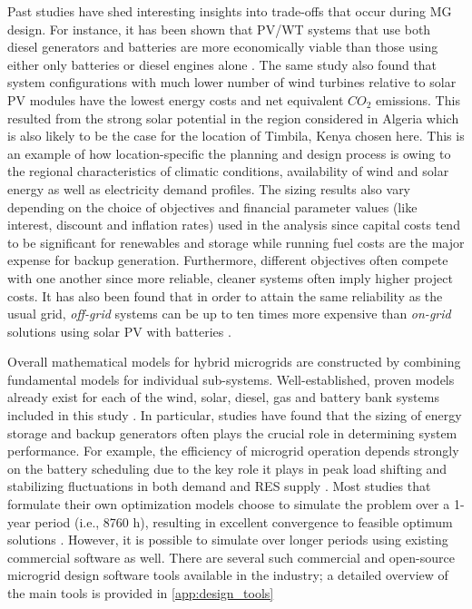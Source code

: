 \documentclass[final,3p,times]{elsarticle}
\begin{document}
Past studies have shed interesting insights into trade-offs that occur during MG design. For instance, it has been shown that PV/WT systems that use both diesel generators and batteries are more economically viable than those using either only batteries or diesel engines alone \cite{kaabeche2014}. The same study also found that system configurations with much lower number of wind turbines relative to solar PV modules have the lowest energy costs and net equivalent $CO_2$ emissions. This resulted from the strong solar potential in the region considered in Algeria \cite{kaabeche2014} which is also likely to be the case for the location of Timbila, Kenya chosen here. This is an example of how location-specific the planning and design process is owing to the regional characteristics of climatic conditions, availability of wind and solar energy as well as electricity demand profiles. The sizing results also vary depending on the choice of objectives and financial parameter values (like interest, discount and inflation rates) used in the analysis since capital costs tend to be significant for renewables and storage while running fuel costs are the major expense for backup generation. Furthermore, different objectives often compete with one another since more reliable, cleaner systems often imply higher project costs. It has also been found that in order to attain the same reliability as the usual grid, \textit{off-grid} systems can be up to ten times more expensive than \textit{on-grid} solutions using solar PV with batteries \cite{weng2016}.

Overall mathematical models for hybrid microgrids are constructed by combining fundamental models for individual sub-systems. Well-established, proven models already exist for each of the wind, solar, diesel, gas and battery bank systems included in this study \cite{bhandari2014}. In particular, studies have found that the sizing of energy storage and backup generators often plays the crucial role in determining system performance. For example, the efficiency of microgrid operation depends strongly on the battery scheduling due to the key role it plays in peak load shifting and stabilizing fluctuations in both demand and RES supply \cite{gu2014}. Most studies that formulate their own optimization models choose to simulate the problem over a 1-year period (i.e., 8760 h), resulting in excellent convergence to feasible optimum solutions \cite{logenthiran2010}. However, it is possible to simulate over longer periods using existing commercial software as well. There are several such commercial and open-source microgrid design software tools available in the industry; a detailed overview of the main tools is provided in \cref{app:design_tools}
\end{document}
